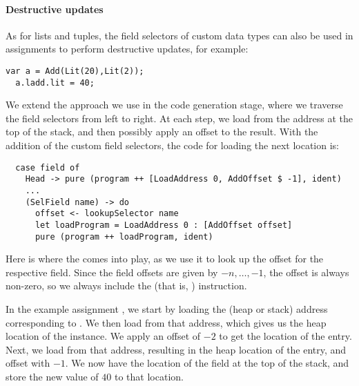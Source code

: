 \paragraph{Destructive updates}
As for lists and tuples, the field selectors of custom data types can also be
used in assignments to perform destructive updates, for example:
\begin{lstlisting}[language=SPL]
  var a = Add(Lit(20),Lit(2));
  a.ladd.lit = 40;
\end{lstlisting}
%
We extend the approach we use in the code generation stage, where we traverse
the field selectors from left to right.
At each step, we load from the address at the top of the stack, and then
possibly apply an offset to the result.
With the addition of the custom field selectors, the code for loading the next
location is:
\begin{verbatim}
  case field of
    Head -> pure (program ++ [LoadAddress 0, AddOffset $ -1], ident)
    ...
    (SelField name) -> do
      offset <- lookupSelector name
      let loadProgram = LoadAddress 0 : [AddOffset offset]
      pure (program ++ loadProgram, ident)
\end{verbatim}

Here is where the  comes into play, as we use it to look up
the offset for the respective field. Since the field offsets are given by
$-n,\dots,-1$, the offset is always non-zero, so we always include the
 (that is, ) instruction.

In the example assignment , we start by loading the
(heap or stack) address corresponding to . We then load from that
address, which gives us the heap location of the  instance. We apply an
offset of $-2$ to get the location of the  entry.
Next, we load from that address, resulting in the heap location of the 
entry, and offset with $-1$. We now have the location of the  field at
the top of the stack, and store the new value of $40$ to that location.




